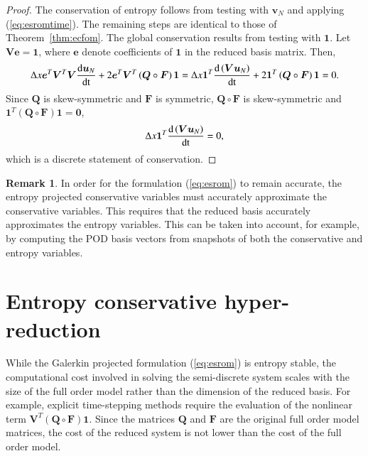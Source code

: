 \documentclass[preprint,10pt]{elsarticle}
\theoremstyle{definition}
\theoremstyle{lemma}
\newtheorem*{remark}{Remark}
\theoremstyle{theorem}
\theoremstyle{assumption}
\newcommand{\td}[2]{\frac{{\rm d}#1}{{\rm d}{\rm #2}}}
\newcommand{\LRp}[1]{\left( #1 \right)}
\begin{document}
\begin{proof}
The conservation of entropy follows from testing with $\bm{v}_N$ and applying (\ref{eq:esromtime}).  The remaining steps are identical to those of Theorem~\ref{thm:ecfom}.  The global conservation results from testing with $\bm{1}$.  Let $\bm{V}\bm{e}=\bm{1}$, where $\bm{e}$ denote coefficients of $\bm{1}$ in the reduced basis matrix.  Then, 
\begin{align*}
\Delta x\bm{e}^T\bm{V}^T\bm{V}\td{\bm{u}_N}{t} + 2\bm{e}^T\bm{V}^T\LRp{\bm{Q}\circ \bm{F}}\bm{1}  = \Delta x\bm{1}^T\td{\LRp{\bm{V}\bm{u}_N}}{t} + 2\bm{1}^T\LRp{\bm{Q}\circ \bm{F}}\bm{1} = 0.
\end{align*}
Since $\bm{Q}$ is skew-symmetric and $\bm{F}$ is symmetric, $\bm{Q} \circ \bm{F}$ is skew-symmetric and $\bm{1}^T\LRp{\bm{Q}\circ \bm{F}}\bm{1} = \bm{0}$, 
\[
\Delta x\bm{1}^T\td{\LRp{\bm{V}\bm{u}_N}}{t} = 0,
\]
which is a discrete statement of conservation.
\end{proof}

\begin{remark}
In order for the formulation (\ref{eq:esrom}) to remain accurate, the entropy projected conservative variables must accurately approximate the conservative variables.  This requires that the reduced basis accurately approximates the entropy variables.  This can be taken into account, for example, by computing the POD basis vectors from snapshots of both the conservative and entropy variables.
\end{remark}


\section{Entropy conservative hyper-reduction}
\label{sec:4}
While the Galerkin projected formulation (\ref{eq:esrom}) is entropy stable, the computational cost involved in solving the semi-discrete system scales with the size of the full order model rather than the dimension of the reduced basis.  For example, explicit time-stepping methods require the evaluation of the nonlinear term $\bm{V}^T\LRp{\bm{Q} \circ \bm{F}}\bm{1}$.  Since the matrices $\bm{Q}$ and $\bm{F}$ are the original full order model matrices, the cost of the reduced system is not lower than the cost of the full order model.  
\end{document}

